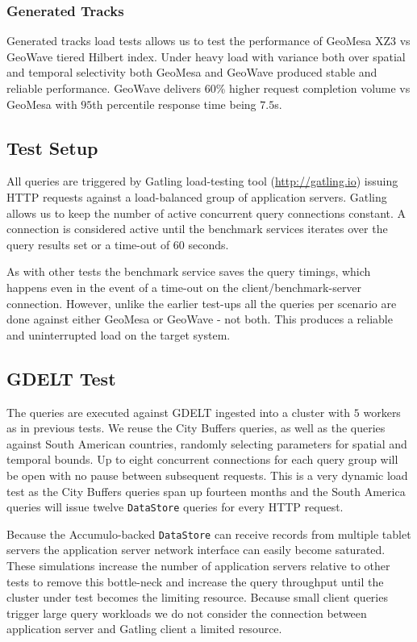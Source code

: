 \subsubsection{Generated Tracks}

Generated tracks load tests allows us to test the performance of GeoMesa XZ3 vs GeoWave tiered Hilbert index.
Under heavy load with variance both over spatial and temporal selectivity both GeoMesa and GeoWave produced stable and reliable performance.
GeoWave delivers $60$\% higher request completion volume vs GeoMesa with $95$th percentile response time being $7.5$s.


\subsection{Test Setup}

All queries are triggered by Gatling load-testing tool (\url{http://gatling.io}) issuing HTTP requests against a load-balanced group of application servers.
Gatling allows us to keep the number of active concurrent query connections constant.
A connection is considered active until the benchmark services iterates over the query results set or a time-out of $60$ seconds.

As with other tests the benchmark service saves the query timings, which happens even in the event of a time-out on the client/benchmark-server connection.
However, unlike the earlier test-ups all the queries per scenario are done against either GeoMesa or GeoWave - not both.
This produces a reliable and uninterrupted load on the target system.

\subsection{GDELT Test}

The queries are executed against GDELT ingested into a cluster with $5$ workers as in previous tests.
We reuse the City Buffers queries, as well as the queries against South American countries, randomly selecting parameters for spatial and temporal bounds.
Up to eight concurrent connections for each query group will be open with no pause between subsequent requests.
This is a very dynamic load test as the City Buffers  queries span up fourteen months and the South America queries will issue twelve \texttt{DataStore} queries for every HTTP request.

Because the Accumulo-backed \texttt{DataStore} can receive records from multiple tablet servers the application server network interface can easily become saturated.
These simulations increase the number of application servers relative to other tests to remove this bottle-neck and increase the query throughput until the cluster under test becomes the limiting resource.
Because small client queries trigger large query workloads we do not consider the connection between application server and Gatling client a limited resource.

